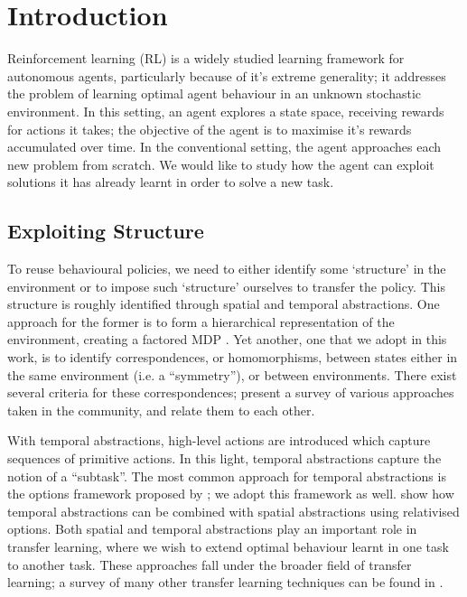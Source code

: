 \chapter{Introduction}
\label{chap:intro}

Reinforcement learning (RL) is a widely studied learning framework for
autonomous agents, particularly because of it's extreme generality; it
addresses the problem of learning optimal agent behaviour in an
unknown stochastic environment. In this setting, an agent explores
a state space, receiving rewards for actions it takes; the objective
of the agent is to maximise it's rewards accumulated over time. In the
conventional setting, the agent approaches each new problem from
scratch. We would like to study how the agent can exploit solutions it
has already learnt in order to solve a new task.

\section{Exploiting Structure}

To reuse behavioural policies, we need to either identify some
`structure' in the environment or to impose such `structure' ourselves
to transfer the policy. This structure is roughly identified through
spatial and temporal abstractions. One approach for the former is to
form a hierarchical representation of the environment, creating
a factored MDP \citep{Guestrin2003}. Yet another, one that we adopt in
this work, is to identify correspondences, or homomorphisms, between
states either in the same environment (i.e.  a ``symmetry''), or between
environments. There exist several criteria for these correspondences;
\citet{Li2006} present a survey of various approaches taken in the
community, and relate them to each other.

With temporal abstractions, high-level actions are introduced which
capture sequences of primitive actions. In this light, temporal
abstractions capture the notion of a ``subtask''. The most common
approach for temporal abstractions is the options framework proposed by
\citet{SuttonPrecupSingh1999}; we adopt this framework as well.
\citet{Ravindran2003} show how temporal abstractions can be combined
with spatial abstractions using relativised options. Both spatial and
temporal abstractions play an important role in transfer learning, where
we wish to extend optimal behaviour learnt in one task to another task.
These approaches fall under the broader field of transfer learning;
a survey of many other transfer learning techniques can be found in
\citet{Taylor2009a}.

